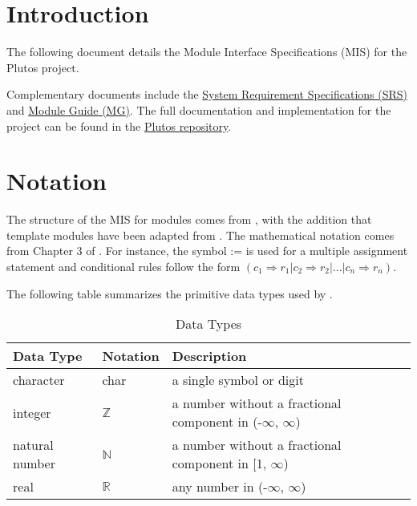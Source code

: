 \documentclass[12pt, titlepage]{article}
\begin{document}
\newpage


\section{Introduction}

The following document details the Module Interface Specifications (MIS) for the
Plutos project.

Complementary documents include the
\href{https://github.com/PlutosCapstone/Plutos/blob/main/docs/SRS/SRS.pdf}{System
Requirement Specifications (SRS)} and
\href{https://github.com/PlutosCapstone/Plutos/blob/main/docs/Design/SoftArchitecture/MG.pdf}{Module
Guide (MG)}. The full documentation and implementation for the project can be
found in the \href{https://github.com/PlutosCapstone/Plutos/tree/main}{Plutos
repository}.

\section{Notation}

The structure of the MIS for modules comes from \citet{HoffmanAndStrooper1995},
with the addition that template modules have been adapted from
\cite{GhezziEtAl2003}.  The mathematical notation comes from Chapter 3 of
\citet{HoffmanAndStrooper1995}.  For instance, the symbol := is used for a
multiple assignment statement and conditional rules follow the form $(c_1
\Rightarrow r_1 | c_2 \Rightarrow r_2 | ... | c_n \Rightarrow r_n )$.

The following table summarizes the primitive data types used by \progname. 

\renewcommand{\arraystretch}{1.2}
\begin{table}[H]
\caption{Data Types}
\centering
\noindent 
\begin{tabular}{l l p{7.5cm}} 
\toprule 
\textbf{Data Type} & \textbf{Notation} & \textbf{Description}\\ 
\midrule
character & char & a single symbol or digit\\
integer & $\mathbb{Z}$ & a number without a fractional component in (-$\infty$, $\infty$) \\
natural number & $\mathbb{N}$ & a number without a fractional component in [1, $\infty$) \\
real & $\mathbb{R}$ & any number in (-$\infty$, $\infty$)\\
\bottomrule
\end{tabular} 
\end{table}
\end{document}
